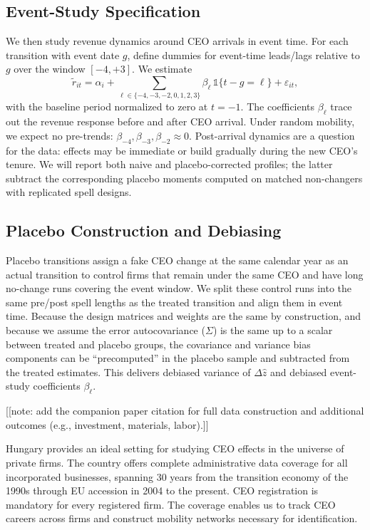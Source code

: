 \documentclass[11pt,a4paper]{article}
\begin{document}
\subsection*{Event-Study Specification}
We then study revenue dynamics around CEO arrivals in event time. For each transition with event date \(g\), define dummies for event-time leads/lags relative to \(g\) over the window \([-4,+3]\). We estimate
\begin{equation}
\tilde r_{it} = \alpha_i + \sum_{\ell\in\{-4,-3,-2,0,1,2,3\}} \beta_{\ell}\,\mathbb 1\{t-g=\ell\} + \varepsilon_{it},
\end{equation}
with the baseline period normalized to zero at \(t=-1\). The coefficients \(\beta_{\ell}\) trace out the revenue response before and after CEO arrival. Under random mobility, we expect no pre-trends: \(\beta_{-4},\beta_{-3},\beta_{-2}\approx 0\). Post-arrival dynamics are a question for the data: effects may be immediate or build gradually during the new CEO’s tenure. We will report both naive and placebo-corrected profiles; the latter subtract the corresponding placebo moments computed on matched non-changers with replicated spell designs.

\subsection*{Placebo Construction and Debiasing}
Placebo transitions assign a fake CEO change at the same calendar year as an actual transition to control firms that remain under the same CEO and have long no-change runs covering the event window. We split these control runs into the same pre/post spell lengths as the treated transition and align them in event time. Because the design matrices and weights are the same by construction, and because we assume the error autocovariance (\(\Sigma\)) is the same up to a scalar between treated and placebo groups, the covariance and variance bias components can be “precomputed” in the placebo sample and subtracted from the treated estimates. This delivers debiased variance of \(\Delta \hat z\) and debiased event-study coefficients \(\beta_{\ell}\).

[[note: add the companion paper citation for full data construction and additional outcomes (e.g., investment, materials, labor).]]

Hungary provides an ideal setting for studying CEO effects in the universe of private firms. The country offers complete administrative data coverage for all incorporated businesses, spanning 30 years from the transition economy of the 1990s through EU accession in 2004 to the present. CEO registration is mandatory for every registered firm. The coverage enables us to track CEO careers across firms and construct mobility networks necessary for identification.
\end{document}
